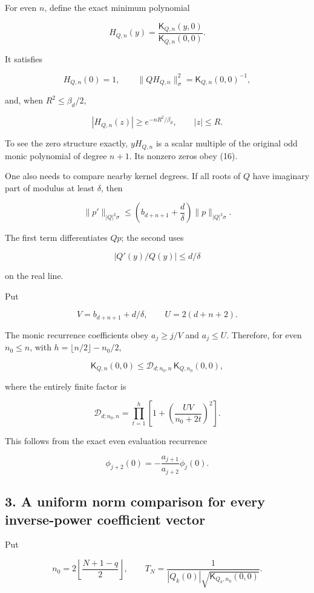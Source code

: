 \documentclass[11pt]{article}
\begin{document}
For even \(n\), define the exact minimum polynomial

\[
H_{Q,n}(y)=
\frac{\mathsf K_{Q,n}(y,0)}{\mathsf K_{Q,n}(0,0)}.
\]

It satisfies

\[
H_{Q,n}(0)=1,\qquad
\|QH_{Q,n}\|_\sigma^2=\mathsf K_{Q,n}(0,0)^{-1},
\]

and, when \(R^2\le\beta_d/2\),

\[
\boxed{
|H_{Q,n}(z)|\ge e^{-nR^2/\beta_d},
\qquad |z|\le R.
}
\tag{19}
\]

To see the zero structure exactly, \(yH_{Q,n}\) is a scalar multiple of the original odd monic polynomial of degree \(n+1\). Its nonzero zeros obey (16).

One also needs to compare nearby kernel degrees. If all roots of \(Q\) have imaginary part of modulus at least \(\delta\), then

\[
\|p'\|_{|Q|^2\sigma}
\le
\left(b_{d+n+1}+\frac d\delta\right)
\|p\|_{|Q|^2\sigma}.
\]

The first term differentiates \(Qp\); the second uses

\[
|Q'(y)/Q(y)|\le d/\delta
\]

on the real line.

Put

\[
V=b_{d+n+1}+d/\delta,\qquad U=2(d+n+2).
\]

The monic recurrence coefficients obey \(a_j\ge j/V\) and \(a_j\le U\). Therefore, for even \(n_0\le n\), with \(h=\lfloor n/2\rfloor-n_0/2\),

\[
\boxed{
\mathsf K_{Q,n}(0,0)
\le
\mathcal D_{d;n_0,n}\,\mathsf K_{Q,n_0}(0,0),
}
\tag{20}
\]

where the entirely finite factor is

\[
\boxed{
\mathcal D_{d;n_0,n}
=
\prod_{t=1}^{h}
\left[
1+\left(\frac{UV}{n_0+2t}\right)^2
\right].
}
\tag{21}
\]

This follows from the exact even evaluation recurrence

\[
\phi_{j+2}(0)
=-\frac{a_{j+1}}{a_{j+2}}\phi_j(0).
\]

\subsection{3. A uniform norm comparison for every inverse-power coefficient vector}\label{a-uniform-norm-comparison-for-every-inverse-power-coefficient-vector}

Put

\[
n_0=2\left\lfloor\frac{N+1-q}{2}\right\rfloor,
\qquad
T_N=
\frac1{|Q_k(0)|\sqrt{\mathsf K_{Q_k,n_0}(0,0)}}.
\tag{22}
\]
\end{document}
